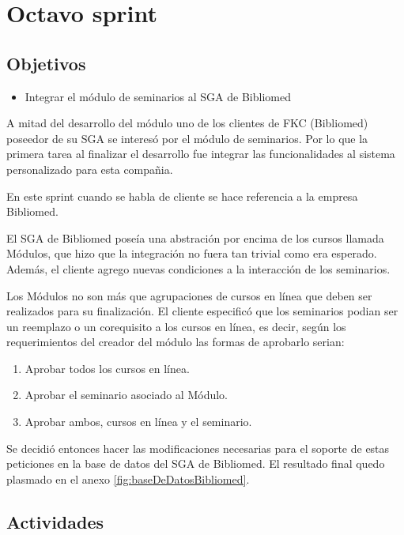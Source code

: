 \section{Octavo sprint} %
\label{sec:octavo_sprint}

\subsection{Objetivos}

\begin{itemize}
	\item Integrar el módulo de seminarios al SGA de Bibliomed
\end{itemize}

A mitad del desarrollo del módulo uno de los clientes de FKC (Bibliomed) poseedor de su SGA se interesó por el módulo de seminarios. Por lo que la primera tarea al finalizar el desarrollo fue integrar las funcionalidades al sistema personalizado para esta compañia.

En este sprint cuando se habla de cliente se hace referencia a la empresa Bibliomed.

El SGA de Bibliomed poseía una abstración por encima de los cursos llamada Módulos, que hizo que la integración no fuera tan trivial como era esperado. Además, el cliente agrego nuevas condiciones a la interacción de los seminarios.

Los Módulos no son más que agrupaciones de cursos en línea que deben ser realizados para su finalización. El cliente especificó que los seminarios podian ser un reemplazo o un corequisito a los cursos en línea, es decir, según los requerimientos del creador del módulo las formas de aprobarlo serian:

\begin{enumerate}
	\item Aprobar todos los cursos en línea.
	\item Aprobar el seminario asociado al Módulo.
	\item Aprobar ambos, cursos en línea y el seminario.
\end{enumerate}

Se decidió entonces hacer las modificaciones necesarias para el soporte de estas peticiones en la base de datos del SGA de Bibliomed. El resultado final quedo plasmado en el anexo \ref{fig:baseDeDatosBibliomed}.

\subsection{Actividades} %
\label{sub:actividades8}

